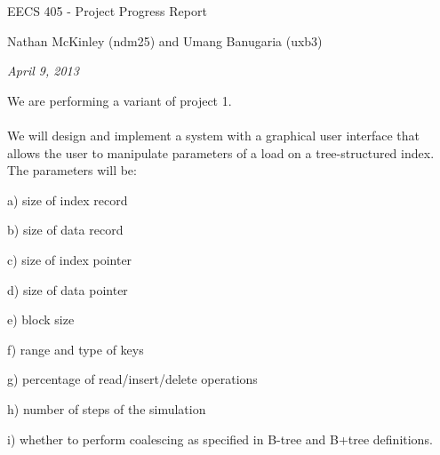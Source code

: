 \documentclass[fleqn]{article}
\begin{document}
\centerline{\sc \large EECS 405 - Project Progress Report}
\vspace{.5pc}
\centerline{\sc Nathan McKinley (ndm25) and Umang Banugaria (uxb3)}
\centerline{\it April 9, 2013}
\vspace{2pc}

\noindent We are performing a variant of project 1.
\\ \\
We will design and implement a system with a graphical user interface that allows the user to manipulate parameters of a load on a tree-structured index.  The parameters will be:

	a) size of index record
	
	b) size of data record
	
	c) size of index pointer
	
	d) size of data pointer
	
	e) block size
	
	f) range and type of keys
	
	g) percentage of read/insert/delete operations
	
	h) number of steps of the simulation
	
	i) whether to perform coalescing as specified in B-tree and B+tree definitions.
	
\end{document}
